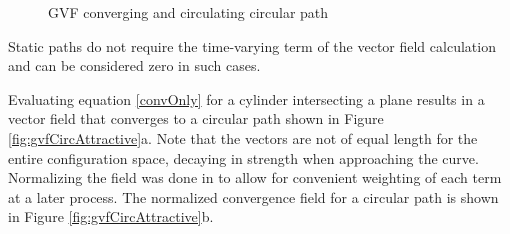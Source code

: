 \documentclass[numbered,pdftex]{ohio-etd}
\begin{document}
\begin{figure}[H]
	\begin{subfigmatrix}{2}%
		\centering	
		\hspace*{0mm}
	\end{subfigmatrix}
	\caption{GVF converging and circulating circular path}
	\label{fig:GVFCirc}
\end{figure}








Static paths do not require the time-varying term of the vector field calculation and can be considered zero in such cases. 


Evaluating equation \ref{convOnly} for a cylinder intersecting a plane results in a vector field that converges to a circular path shown in Figure \ref{fig:gvfCircAttractive}a. Note that the vectors are not of equal length for the entire configuration space, decaying in strength when approaching the curve. Normalizing the field was done in \cite{goncalves_circulation_2010,goncalves_vector_2010,wwc} to allow for convenient weighting of each term at a later process. The normalized convergence field for a circular path is shown in Figure \ref{fig:gvfCircAttractive}b. 
\end{document}
